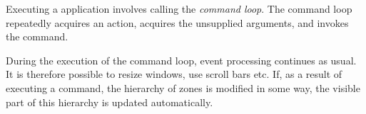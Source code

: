 Executing a \clim{} application involves calling the \clim{}
\emph{command loop}.  The command loop repeatedly acquires an action,
acquires the unsupplied arguments, and invokes the command.  

During the execution of the command loop, event processing continues
as usual.  It is therefore possible to resize windows, use scroll bars
etc.  If, as a result of executing a command, the hierarchy of zones
is modified in some way, the visible part of this hierarchy is updated
automatically.

